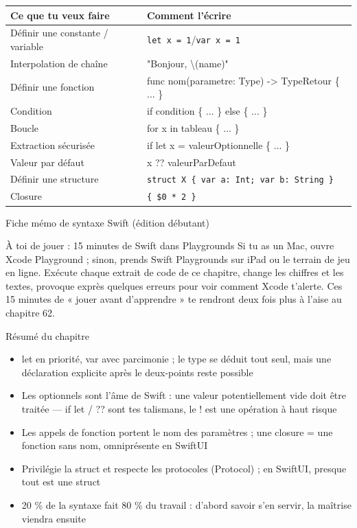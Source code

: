 \begin{center}
\begin{tabularx}{\linewidth}{|X|X|}
\hline
\textbf{Ce que tu veux faire} & \textbf{Comment l'écrire} \tabularnewline
\hline
Définir une constante / variable & \texttt{let x = 1}/\texttt{var x = 1} \tabularnewline
Interpolation de chaîne & "Bonjour, \textbackslash{}(name)" \tabularnewline
Définir une fonction & func nom(parametre: Type) -> TypeRetour \{ ... \} \tabularnewline
Condition & if condition \{ ... \} else \{ ... \} \tabularnewline
Boucle & for x in tableau \{ ... \} \tabularnewline
Extraction sécurisée & if let x = valeurOptionnelle \{ ... \} \tabularnewline
Valeur par défaut & x ?? valeurParDefaut \tabularnewline
Définir une structure & \texttt{struct X \{ var a: Int; var b: String \}} \tabularnewline
Closure & \texttt{\{ \$0 * 2 \}} \tabularnewline
\hline
\end{tabularx}
\end{center}

\begin{center}\small\color{gray}Fiche mémo de syntaxe Swift (édition débutant)\end{center}

\begin{tcbpractice}{À toi de jouer : 15 minutes de Swift dans Playgrounds}
Si tu as un Mac, ouvre Xcode Playground ; sinon, prends Swift Playgrounds sur iPad ou le terrain de jeu en ligne. Exécute chaque extrait de code de ce chapitre, change les chiffres et les textes, provoque exprès quelques erreurs pour voir comment Xcode t'alerte. Ces 15 minutes de « jouer avant d'apprendre » te rendront deux fois plus à l'aise au chapitre 62.

\end{tcbpractice}

\begin{tcbsummary}{Résumé du chapitre}
\begin{itemize}
  \item let en priorité, var avec parcimonie ; le type se déduit tout seul, mais une déclaration explicite après le deux-points reste possible
  \item Les optionnels sont l'âme de Swift : une valeur potentiellement vide doit être traitée — if let / ?? sont tes talismans, le ! est une opération à haut risque
  \item Les appels de fonction portent le nom des paramètres ; une closure = une fonction sans nom, omniprésente en SwiftUI
  \item Privilégie la struct et respecte les protocoles (Protocol) ; en SwiftUI, presque tout est une struct
  \item 20 \% de la syntaxe fait 80 \% du travail : d'abord savoir s'en servir, la maîtrise viendra ensuite
\end{itemize}

\end{tcbsummary}
